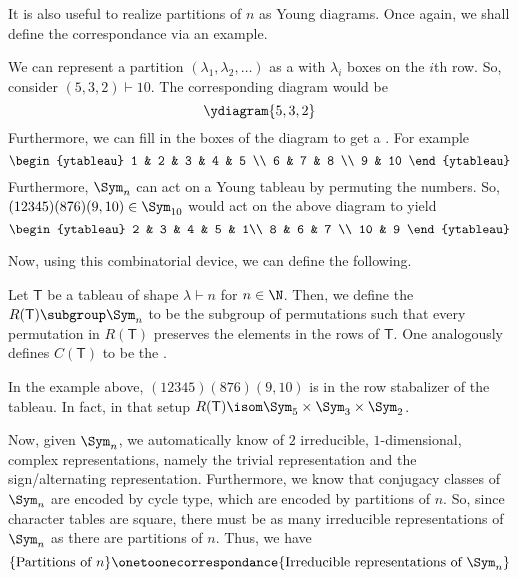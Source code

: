 \documentclass[11pt,leqno,oneside]{amsbook}
\newcommand{\partitionof}{\vdash}
\newcommand{\T}{\mathsf{T}}
\numberwithin{thm}{section}
\begin{document}
It is also useful to realize partitions of \(n\) as Young
diagrams. Once again, we shall define the correspondance via an
example.
\begin{example}
  We can represent a partition \((\lambda_1, \lambda_2, \ldots)\) as a
   with \(\lambda_i\) boxes on the \(i\)th row. So,
  consider \((5,3,2) \partitionof 10\). The corresponding diagram
  would be \[
    \ydiagram{5,3,2}
  \]
  Furthermore, we can fill in the boxes of the diagram to get a . For example \[ 
    \begin{ytableau}
      1 & 2 & 3 & 4 & 5 \\
      6 & 7 & 8 \\
      9 & 10
    \end{ytableau}
  \]
  Furthermore, \(\Sym_n\) can act on a Young tableau by permuting the
  numbers. So, \((12345)(876)(9,10) \in \Sym_{10}\) would act on the
  above diagram to yield \[
    \begin{ytableau}
      2 & 3 & 4 & 5 & 1\\
      8 & 6 & 7 \\
      10 & 9
    \end{ytableau}
  \]
\end{example}
Now, using this combinatorial device, we can define the following.
\begin{defn}
  Let \(\T\) be a tableau of shape \(\lambda \partitionof n\) for \(n
  \in \N\). Then, we define the 
  \(R(\T) \subgroup \Sym_n\) to be the subgroup of
  permutations such that
  every permutation in \(R(\T)\) preserves the elements in
  the rows of \(\T\). One analogously defines \(C(\T)\) to be the
  .
\end{defn}
\begin{example}
  In the example above, \((12345)(876)(9,10)\) is in the row
  stabalizer of the tableau. In fact, in that setup \(R(\T) \isom \Sym_5 \times
  \Sym_3 \times \Sym_2\). 
\end{example}
Now, given \(\Sym_n\), we automatically know of \(2\) irreducible,
\(1\)-dimensional, complex representations, namely the trivial
representation 
and the sign/alternating representation. Furthermore, we know that
conjugacy classes of \(\Sym_n\) are encoded by cycle type, which are
encoded by partitions of \(n\). So, since character tables are square,
there must be as many irreducible representations of \(\Sym_n\) as
there are partitions of \(n\). Thus, we have \[
  \{\text{Partitions of }n\} \onetoonecorrespondance
  \{\text{Irreducible representations of }\Sym_n\}
\]
\end{document}
